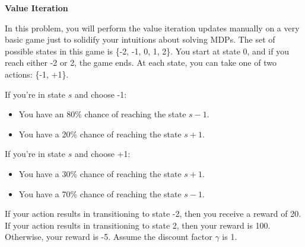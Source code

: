 \item {\bf Value Iteration}

In this problem, you will perform the value iteration updates manually on a very
basic game just to solidify your intuitions about solving MDPs. The set of
possible states in this game is \{-2, -1, 0, 1, 2\}.  You start at state 0, and
if you reach either -2 or 2, the game ends. At each state, you can take one of
two actions: \{-1, +1\}.

If you're in state $s$ and choose -1:
\begin{itemize}
  \item You have an 80\% chance of reaching the state $s-1$.
  \item You have a 20\% chance of reaching the state $s+1$.
\end{itemize}

If you're in state $s$ and choose +1:
\begin{itemize}
  \item You have a 30\% chance of reaching the state $s+1$.
  \item You have a 70\% chance of reaching the state $s-1$.
\end{itemize}

If your action results in transitioning to state -2, then you receive a reward
of 20. If your action results in transitioning to state 2, then your reward is
100. Otherwise, your reward is -5. Assume the discount factor $\gamma$ is 1.

\begin{enumerate}

  

  

  

  

\end{enumerate}
